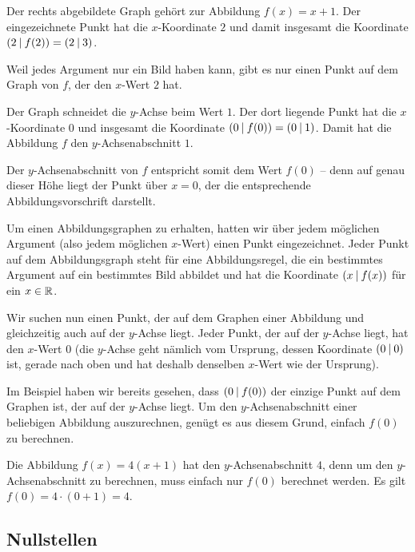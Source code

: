 \documentclass[../../main.tex]{subfiles}
\begin{document}
\begin{example}
    \parpic[r]{
    }
    Der rechts abgebildete Graph gehört zur Abbildung \mbox{$f(x)=x+1$}. Der eingezeichnete Punkt hat die $x$-Koordinate $2$ und damit insgesamt die Koordinate $\left(2 \:\middle|\: f(2)\right)=\left(2 \:\middle|\: 3\right)$. 
    
    Weil jedes Argument nur ein Bild haben kann, gibt es nur einen Punkt auf dem Graph von $f$, der den $x$-Wert $2$ hat.
    
    Der Graph schneidet die $y$-Achse beim Wert $1$. Der dort liegende Punkt hat die $x$-Koordinate $0$ und insgesamt die Koordinate $\left(0 \:\middle|\: f(0)\right)=\left(0 \:\middle|\: 1\right)$. Damit hat die Abbildung $f$ den $y$-Achsenabschnitt $1$.
    
    Der $y$-Achsenabschnitt von $f$ entspricht somit dem Wert $f(0)$ -- denn auf genau dieser Höhe liegt der Punkt über $x=0$, der die entsprechende Abbildungsvorschrift darstellt.
\end{example}

Um einen Abbildungsgraphen zu erhalten, hatten wir über jedem möglichen Argument (also jedem möglichen $x$-Wert) einen Punkt eingezeichnet. Jeder Punkt auf dem Abbildungsgraph steht für eine Abbildungsregel, die ein bestimmtes Argument auf ein bestimmtes Bild abbildet und hat die Koordinate $\left(x \:\middle|\: f(x)\right)$ für ein $x\in\mathbb{R}$.

Wir suchen nun einen Punkt, der auf dem Graphen einer Abbildung und gleichzeitig auch auf der $y$-Achse liegt. Jeder Punkt, der auf der $y$-Achse liegt, hat den $x$-Wert $0$ (die $y$-Achse geht nämlich vom Ursprung, dessen Koordinate $\left(0 \:\middle|\: 0\right)$ ist, gerade nach oben und hat deshalb denselben $x$-Wert wie der Ursprung). 

Im Beispiel haben wir bereits gesehen, dass $\left(0 \:\middle|\: f(0)\right)$ der einzige Punkt auf dem Graphen ist, der auf der $y$-Achse liegt. Um den $y$-Achsenabschnitt einer beliebigen Abbildung auszurechnen, genügt es aus diesem Grund, einfach $f(0)$ zu berechnen.

\begin{example}
    \sloppy
    Die Abbildung $f(x)=4(x+1)$ hat den $y$-Achsenabschnitt $4$, denn um den $y$-Achsenabschnitt zu berechnen, muss einfach nur $f(0)$ berechnet werden. Es gilt $f(0)=4\cdot (0+1)=4$.
\end{example}

\fussy

\subsection{Nullstellen}
\label{sec:abbildungen_nullstelle}
\end{document}
